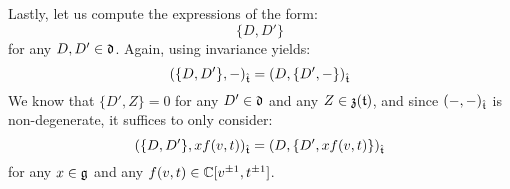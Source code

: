 \begin{remark}
                Lastly, let us compute the expressions of the form:
                    $$\{D, D'\}$$
                for any $D, D' \in \mathfrak{d}$. Again, using invariance yields:
                    $$( \{D, D'\}, - )_{\hat{\mathfrak{t}}} = ( D, \{D', -\} )_{\hat{\mathfrak{t}}}$$
                We know that $\{D', Z\} = 0$ for any $D' \in \mathfrak{d}$ and any $Z \in \mathfrak{z}(\mathfrak{t})$, and since $(-, -)_{\hat{\mathfrak{t}}}$ is non-degenerate, it suffices to only consider:
                    $$( \{D, D'\}, x f(v, t) )_{\hat{\mathfrak{t}}} = ( D, \{D', x f(v, t)\} )_{\hat{\mathfrak{t}}}$$
                for any $x \in \mathfrak{g}$ and any $f(v, t) \in \mathbb{C}[v^{\pm 1}, t^{\pm 1}]$. 
            \end{remark}
    
    \printbibliography

